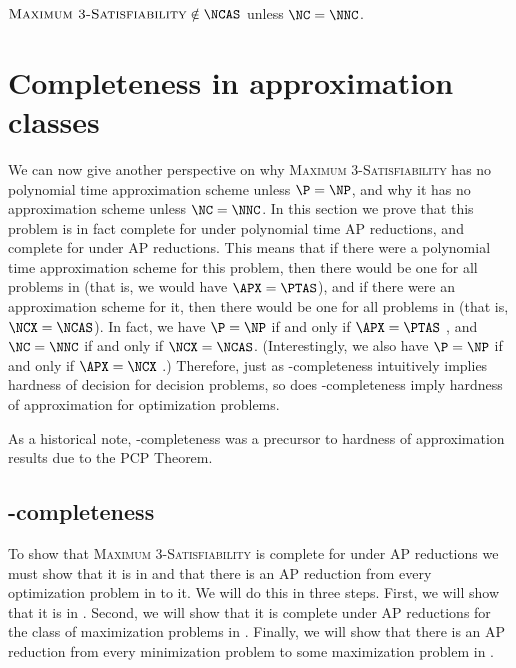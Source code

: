 \documentclass[]{article}
\begin{document}
\begin{corollary}
  $\textsc{Maximum 3-Satisfiability} \notin \NCAS$ unless $\NC = \NNC$.
\end{corollary}

\section{Completeness in approximation classes}\label{sec:complete}

We can now give another perspective on why \textsc{Maximum 3-Satisfiability} has no polynomial time approximation scheme unless $\P = \NP$, and why it has no \NC{} approximation scheme unless $\NC = \NNC$.
In this section we prove that this problem is in fact complete for \APX{} under polynomial time AP reductions, and complete for \NCX{} under \NC{} AP reductions.
This means that if there were a polynomial time approximation scheme for this problem, then there would be one for all problems in \APX{} (that is, we would have $\APX = \PTAS$), and if there were an \NC{} approximation scheme for it, then there would be one for all problems in \NCX{} (that is, $\NCX = \NCAS$).
In fact, we have $\P = \NP$ if and only if $\APX = \PTAS$ \cite[Section~2]{crescenzi97}, and $\NC = \NNC$ if and only if $\NCX = \NCAS$.
(Interestingly, we also have $\P = \NP$ if and only if $\APX = \NCX$ \cite[Theorem~8.2.9]{dsst97}.)
Therefore, just as \NP-completeness intuitively implies hardness of decision for decision problems, so does \APX-completeness imply hardness of approximation for optimization problems.

As a historical note, \APX{}-completeness was a precursor to hardness of approximation results due to the PCP Theorem.

\subsection{\texorpdfstring{\APX}{APX}-completeness}\label{ssc:apxcomplete}

To show that \textsc{Maximum 3-Satisfiability} is complete for \APX{} under AP reductions we must show that it is in \APX{} and that there is an AP reduction from every optimization problem in \APX{} to it.
We will do this in three steps.
First, we will show that it is in \APX.
Second, we will show that it is complete under AP reductions for the class of maximization problems in \APX.
Finally, we will show that there is an AP reduction from every minimization problem to some maximization problem in \APX.
\end{document}
